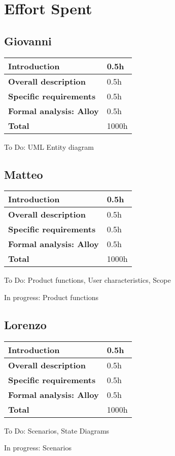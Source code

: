 \section{Effort Spent}
\subsection*{Giovanni}
\begin{table}[h]
    \begin{tabular}{|l|l|}
        \toprule
        \textbf{Introduction}           & 0.5h  \\ \midrule
        \textbf{Overall description}    & 0.5h  \\ \midrule
        \textbf{Specific requirements}  & 0.5h  \\ \midrule
        \textbf{Formal analysis: Alloy} & 0.5h  \\ \midrule
        \textbf{Total}                  & 1000h \\ \bottomrule
    \end{tabular}
\end{table}

To Do: UML Entity diagram

\subsection*{Matteo}
\begin{table}[h]
    \begin{tabular}{|l|l|}
        \toprule
        \textbf{Introduction}           & 0.5h  \\ \midrule
        \textbf{Overall description}    & 0.5h  \\ \midrule
        \textbf{Specific requirements}  & 0.5h  \\ \midrule
        \textbf{Formal analysis: Alloy} & 0.5h  \\ \midrule
        \textbf{Total}                  & 1000h \\ \bottomrule
    \end{tabular}
\end{table}
To Do: Product functions, User characteristics, Scope

In progress: Product functions

\subsection*{Lorenzo}
\begin{table}[h]
    \begin{tabular}{|l|l|}
        \toprule
        \textbf{Introduction}           & 0.5h  \\ \midrule
        \textbf{Overall description}    & 0.5h  \\ \midrule
        \textbf{Specific requirements}  & 0.5h  \\ \midrule
        \textbf{Formal analysis: Alloy} & 0.5h  \\ \midrule
        \textbf{Total}                  & 1000h \\ \bottomrule
    \end{tabular}
\end{table}
To Do: Scenarios, State Diagrams

In progress: Scenarios
